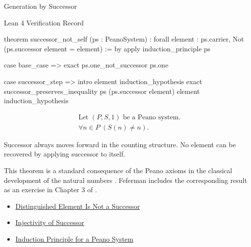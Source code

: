 \begin{topicbox}{Generation by Successor}
\begin{formalizationrecord}{Lean 4 Verification Record}
\begin{leancode}
theorem successor_not_self
    (ps : PeanoSystem) :
    forall element : ps.carrier,
      Not (ps.successor element = element) := by
  apply induction_principle ps

  case base_case =>
    exact ps.one_not_successor ps.one

  case successor_step =>
    intro element induction_hypothesis
    exact
      successor_preserves_inequality
        ps
        (ps.successor element)
        element
        induction_hypothesis
\end{leancode}
\end{formalizationrecord}

\begin{remark*}
\[
\begin{aligned}
&\text{Let } (P,S,1) \text{ be a Peano system.}\\
&\forall n \in P\;(S(n) \neq n).
\end{aligned}
\]
\end{remark*}

\begin{remark*}[Interpretation]
Successor always moves forward in the counting structure. No element can be
recovered by applying successor to itself.
\end{remark*}

\begin{remark*}
This theorem is a standard consequence of the Peano axioms in the classical
development of the natural numbers \citep{PeanoArithmeticesPrincipia1889}.
Feferman includes the corresponding result as an exercise in Chapter 3 of
\citet{FefermanNumberSystems1964}.
\end{remark*}

\begin{dependencies}
\begin{itemize}
  \item \hyperref[ax:peano-one-not-successor]{Distinguished Element Is Not a Successor}
  \item \hyperref[ax:peano-successor-injective]{Injectivity of Successor}
  \item \hyperref[thm:induction-principle-for-peano-system]{Induction Principle for a Peano System}
\end{itemize}
\end{dependencies}
\end{topicbox}

